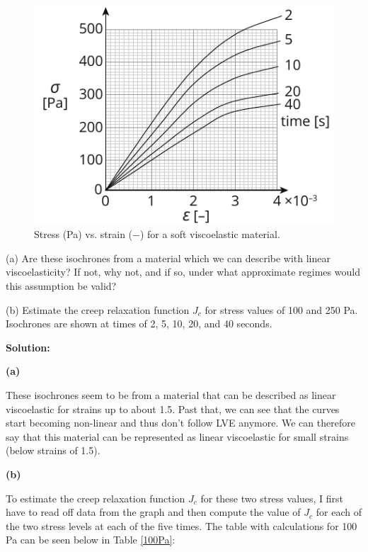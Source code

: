 \begin{figure}[H]
\vspace{-1em}
\centering
\includegraphics[scale = 1.5]{instr-figures/PS2-Q3.pdf}
\caption{\small{Stress (Pa) vs. strain ($-$) for a soft viscoelastic material.}}
\end{figure}

\vspace{-1em}
(a) Are these isochrones from a material which we can describe with linear viscoelasticity? If not, why not, and if so, under what approximate regimes would this assumption be valid? 

\medskip
(b) Estimate the creep relaxation function $J_c$ for stress values of 100 and 250 Pa. Isochrones are shown at times of 2, 5, 10, 20, and 40 seconds.   

\textbf{Solution:}

\textbf{(a)}

These isochrones seem to be from a material that can be described as linear viscoelastic for strains up to about 1.5. Past that, we can see that the curves start becoming non-linear and thus don't follow LVE anymore. We can therefore say that this material can be represented as linear viscoelastic for small strains (below strains of 1.5).

\textbf{(b)}

To estimate the creep relaxation function $J_c$ for these two stress values, I first have to read off data from the graph and then compute the value of $J_c$ for each of the two stress levels at each of the five times.
\newpage
The table with calculations for 100 Pa can be seen below in Table \ref{100Pa}:


